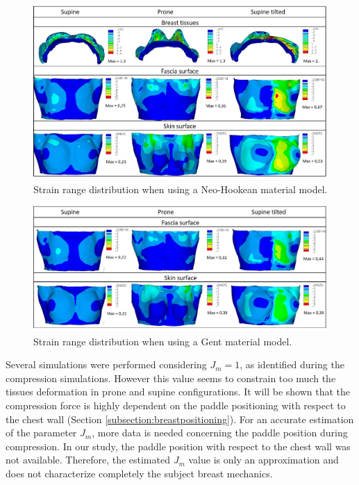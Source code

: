 \begin{figure}[!h]
\centering
\includegraphics[width=\textwidth,keepaspectratio]{figures/strain_range_neo.jpg} 
\caption{Strain range distribution when using a Neo-Hookean material model. }\label{fig:strain_range_neo}
\end{figure}
 

\begin{figure}[!h]
\centering
\includegraphics[width=\textwidth,keepaspectratio]{figures/strain_range_gent.jpg} 
\caption{Strain range distribution when using a Gent material model. }\label{fig:strain_range_gent}
\end{figure}

 Several simulations were performed considering $J_m = 1$, as identified during the compression simulations. However this value seems to constrain too much the tissues deformation in prone and supine configurations. It will be shown that the compression force is highly dependent on the paddle positioning with respect to the chest wall (Section \ref{subsection:breastpositioning}). For an accurate estimation of the parameter $J_m$, more data is needed concerning the paddle position during compression. In our study, the paddle position with respect to the chest wall was not available. Therefore, the estimated $J_m$ value is only an approximation and does not characterize completely the subject breast mechanics.    
 
